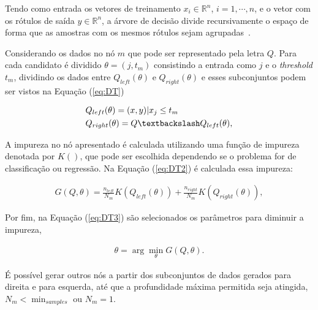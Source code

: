           Tendo como entrada os vetores de treinamento $x_{i} \in \mathbb{R}^{n}$, $i=1,\cdots, n$, e o vetor com os rótulos de saída $y \in \mathbb{R}^{n}$,
          a árvore de decisão divide recursivamente o espaço de forma que as amostras com os mesmos rótulos sejam agrupadas~\cite{breiman2017classification}.

          Considerando os dados no nó $m$ que pode ser representado pela letra $Q$. Para cada candidato é dividido $\theta = (j,t_{m})$ consistindo 
          a entrada como $j$ e o \textit{threshold} $t_{m}$, dividindo os dados entre $Q_{left}(\theta)$ e $Q_{right}(\theta)$ e esses subconjuntos podem ser vistos na
          Equação (\ref{eq:DT})


          \begin{equation}\label{eq:DT}
            \begin{aligned}
              & Q_{left}(\theta) = (x,y)|x_{j} \leq t_{m} \\
              & Q_{right}(\theta) = Q \textbackslash Q_{left}(\theta),
          \end{aligned}
          \end{equation}


          A impureza no nó apresentado é calculada utilizando uma função de impureza denotada por $K()$, que pode ser escolhida dependendo se o 
          problema for de classificação ou regressão. Na Equação (\ref{eq:DT2}) é calculada essa impureza:

          \begin{equation}\label{eq:DT2}
            \begin{aligned}
              G(Q,\theta) = \frac{n_{left}}{N_{m}}K(Q_{left}(\theta)) + \frac{n_{right}}{N_{m}}K(Q_{right}(\theta)),
          \end{aligned}
          \end{equation}


          Por fim, na Equação (\ref{eq:DT3}) são selecionados os parâmetros para diminuir a impureza,

          \begin{equation}\label{eq:DT3}
            \begin{aligned}
              \theta = \arg\min_{\theta}G(Q,\theta).
          \end{aligned} 
          \end{equation}

          É possível gerar outros nós a partir dos subconjuntos de dados gerados para direita e para esquerda, 
          até que a profundidade máxima permitida seja atingida, $N_{m} < \min_{samples}$ ou $N_{m} = 1$.

